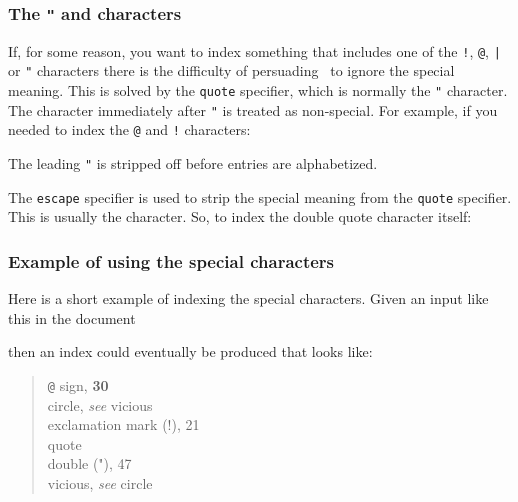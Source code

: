 {\subsubsection{The \texttt{"} and \texttt{\bs} characters}

    If, for some reason, you want to index something that includes one
of the \texttt{!}, \texttt{@}, \texttt{|} or \texttt{"} characters there
is the difficulty of persuading \Lmakeindex\ to ignore the special
meaning. This is solved by the \texttt{quote} specifier, which is
normally the \texttt{"} character. 
The character
immediately after \texttt{"} is treated as non-special. For example,
if you needed to index the \texttt{@} and \texttt{!} characters:
\begin{lcode}
\end{lcode}
The leading \texttt{"} is stripped off before entries are alphabetized.

    The \texttt{escape} specifier is used to strip the special meaning
from the \texttt{quote} specifier. This is usually the \texttt{\bs}
character. 
So, to index the double quote character itself:
\begin{lcode}
\end{lcode}

\subsubsection{Example of using the special characters}

    Here is a short example of indexing the special characters. Given an
input like this in the document
\begin{lcode}
\end{lcode}
then an index could eventually be produced that looks like:
\begin{quote}
\texttt{@} sign, \textbf{30}\\
circle, \textit{see} vicious\\
exclamation mark (!), 21 \\
quote \\
\hspace*{1.5em} double ("), 47 \\
vicious, \textit{see} circle\\
\end{quote}


}
